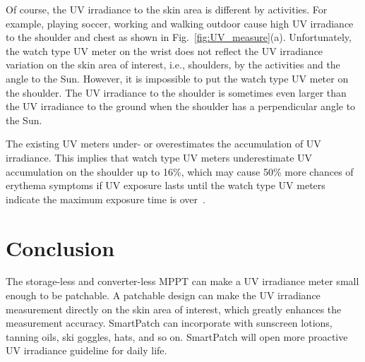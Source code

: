 \documentclass[journal]{IEEEtran}
\begin{document}
Of course, the UV irradiance to the skin area is different by activities. 
For example, playing soccer, working and walking outdoor cause high UV irradiance to the shoulder and chest as shown in Fig.~\ref{fig:UV_measure}(a).
Unfortunately, the watch type UV meter on the wrist does not reflect the UV irradiance variation on the skin area of interest, i.e., shoulders, by the activities and the angle to the Sun.
However, it is impossible to put the watch type UV meter on the shoulder.
The UV irradiance to the shoulder is sometimes even larger than the UV irradiance to the ground when the shoulder has a perpendicular angle to the Sun.

The existing UV meters under- or overestimates the accumulation of UV irradiance. 
This implies that watch type UV meters underestimate UV accumulation on the shoulder up to 16\%, which may cause 50\% more chances of erythema symptoms if UV exposure lasts until the watch type UV meters indicate the maximum exposure time is over~\cite{Harrison:Method02}.

\section{Conclusion}

The storage-less and converter-less MPPT can make a UV irradiance meter small enough to be patchable. 
A patchable design can make the UV irradiance measurement directly on the skin area of interest, which greatly enhances the measurement accuracy. 
SmartPatch can incorporate with sunscreen lotions, tanning oils, ski goggles, hats, and so on. 
SmartPatch will open more proactive UV irradiance guideline for daily life.








%
%

\end{document}

